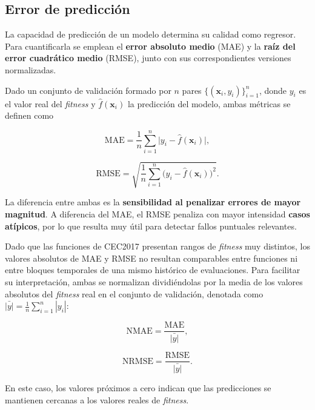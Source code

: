 \subsection{Error de predicción}

La capacidad de predicción de un modelo determina su calidad como regresor.
Para cuantificarla se emplean el \textbf{error absoluto medio} (MAE) y la
\textbf{raíz del error cuadrático medio} (RMSE), junto con sus correspondientes
versiones normalizadas.

Dado un conjunto de validación formado por \(n\) pares
\(\{(\mathbf{x}_i, y_i)\}_{i=1}^{n}\), donde \(y_i\) es el valor real del
\textit{fitness} y \(\hat{f}(\mathbf{x}_i)\) la predicción del modelo, ambas
métricas se definen como


\begin{equation}
    \text{MAE} = \frac{1}{n}\sum_{i=1}^{n} \bigl|y_i - \hat{f}(\mathbf{x}_i)\bigr|,
    \label{eq:mae}
\end{equation}

\begin{equation}
    \text{RMSE} = \sqrt{\frac{1}{n}\sum_{i=1}^{n} \bigl(y_i - \hat{f}(\mathbf{x}_i)\bigr)^2}.
    \label{eq:rmse}
\end{equation}

La diferencia entre ambas es la \textbf{sensibilidad al penalizar errores de mayor magnitud}. A diferencia del MAE, el RMSE penaliza con mayor intensidad \textbf{casos atípicos}, por lo que resulta muy útil para detectar fallos puntuales relevantes.

Dado que las funciones de CEC2017 presentan rangos de \textit{fitness} muy distintos, los valores absolutos de MAE y RMSE no resultan comparables entre funciones ni entre bloques temporales de una mismo histórico de evaluaciones. Para facilitar su interpretación, ambas se normalizan dividiéndolas por la media de los valores absolutos del \textit{fitness} real en el conjunto de validación, denotada como \(\bar{|y|} = \frac{1}{n}\sum_{i=1}^{n}|y_i|\):

\begin{equation}
    \text{NMAE} = \frac{\text{MAE}}{\bar{|y|}},
    \label{eq:nmae}
\end{equation}

\begin{equation}
    \text{NRMSE} = \frac{\text{RMSE}}{\bar{|y|}}.
    \label{eq:nrmse}
\end{equation}

En este caso, los valores próximos a cero indican que las predicciones se
mantienen cercanas a los valores reales de \textit{fitness}.

